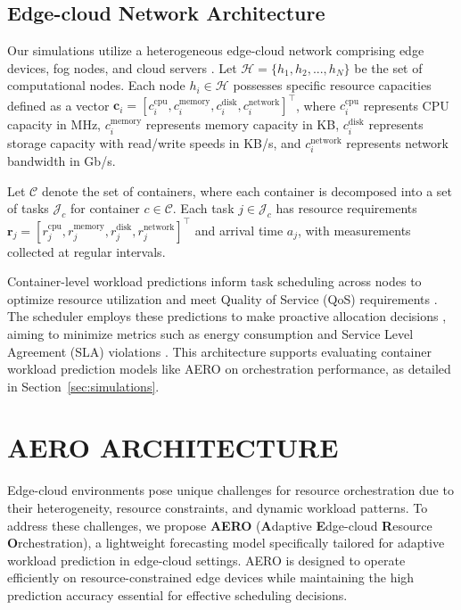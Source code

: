 \documentclass{ieeetmlcn}
\begin{document}
\subsection{Edge-cloud Network Architecture}

Our simulations utilize a heterogeneous edge-cloud network comprising edge devices, fog nodes, and cloud servers \cite{tuli2021cosco}. Let $\mathcal{H} = \{h_1, h_2, ..., h_N\}$ be the set of computational nodes. Each node $h_i \in \mathcal{H}$ possesses specific resource capacities defined as a vector $\mathbf{c}_i = [c_i^{\text{cpu}}, c_i^{\text{memory}}, c_i^{\text{disk}}, c_i^{\text{network}}]^\top$, where $c_i^{\text{cpu}}$ represents CPU capacity in MHz, $c_i^{\text{memory}}$ represents memory capacity in KB, $c_i^{\text{disk}}$ represents storage capacity with read/write speeds in KB/s, and $c_i^{\text{network}}$ represents network bandwidth in Gb/s.

Let $\mathcal{C}$ denote the set of containers, where each container is decomposed into a set of tasks $\mathcal{J}_c$ for container $c \in \mathcal{C}$. Each task $j \in \mathcal{J}_c$ has resource requirements $\mathbf{r}_j = [r_j^{\text{cpu}}, r_j^{\text{memory}}, r_j^{\text{disk}}, r_j^{\text{network}}]^\top$ and arrival time $a_j$, with measurements collected at regular intervals.

Container-level workload predictions inform task scheduling across nodes to optimize resource utilization and meet Quality of Service (QoS) requirements \cite{tuli2021cosco}. The scheduler employs these predictions to make proactive allocation decisions \cite{farhad2023ai}, aiming to minimize metrics such as energy consumption and Service Level Agreement (SLA) violations \cite{raith2024opportunistic}. This architecture supports evaluating container workload prediction models like AERO on orchestration performance, as detailed in Section~\ref{sec:simulations}.

\section{AERO ARCHITECTURE}
\label{sec:proposed_solution}

{\color{blue}
Edge-cloud environments pose unique challenges for resource orchestration due to their heterogeneity, resource constraints, and dynamic workload patterns. To address these challenges, we propose \textbf{AERO} (\textbf{A}daptive \textbf{E}dge-cloud \textbf{R}esource \textbf{O}rchestration), a lightweight forecasting model specifically tailored for adaptive workload prediction in edge-cloud settings. AERO is designed to operate efficiently on resource-constrained edge devices while maintaining the high prediction accuracy essential for effective scheduling decisions.
}
\end{document}

